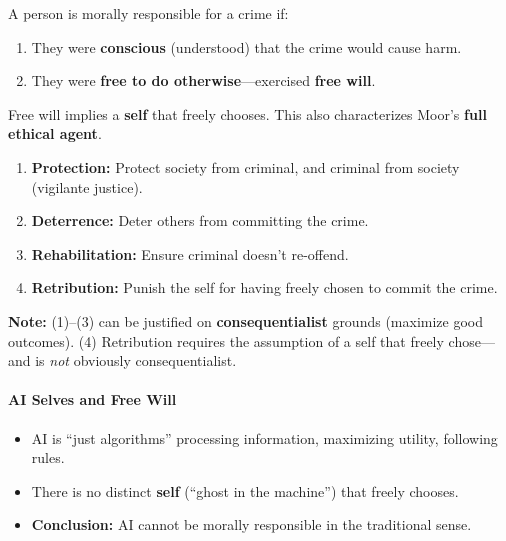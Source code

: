 \begin{defbox}
A person is morally responsible for a crime if:
\begin{enumerate}
  \item They were \textbf{conscious} (understood) that the crime would cause harm.
  \item They were \textbf{free to do otherwise}---exercised \textbf{free will}.
\end{enumerate}

Free will implies a \textbf{self} that freely chooses. This also characterizes Moor's \textbf{full ethical agent}.
\end{defbox}

\begin{keybox}
\begin{enumerate}
  \item \textbf{Protection:} Protect society from criminal, and criminal from society (vigilante justice).
  \item \textbf{Deterrence:} Deter others from committing the crime.
  \item \textbf{Rehabilitation:} Ensure criminal doesn't re-offend.
  \item \textbf{Retribution:} Punish the self for having freely chosen to commit the crime.
\end{enumerate}

\textbf{Note:} (1)--(3) can be justified on \textbf{consequentialist} grounds (maximize good outcomes). (4) Retribution requires the assumption of a self that freely chose---and is \textit{not} obviously consequentialist.
\end{keybox}

\separator

\paragraph*{AI Selves and Free Will}

\begin{thmbox}
\begin{itemize}
  \item AI is ``just algorithms'' processing information, maximizing utility, following rules.
  \item There is no distinct \textbf{self} (``ghost in the machine'') that freely chooses.
  \item \textbf{Conclusion:} AI cannot be morally responsible in the traditional sense.
\end{itemize}
\end{thmbox}

